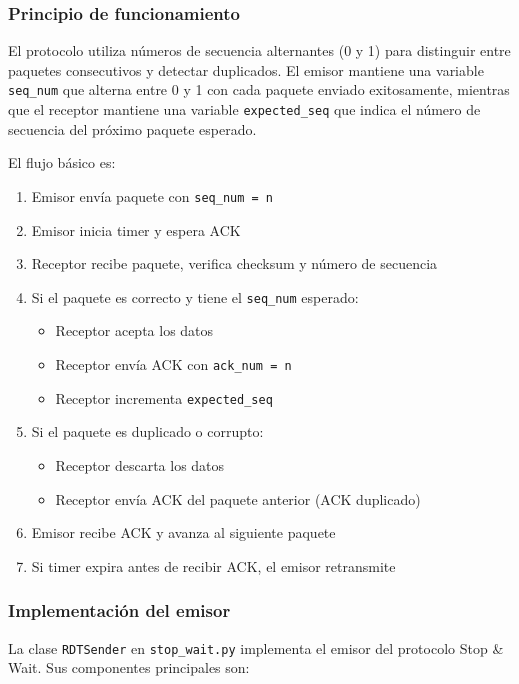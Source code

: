 \subsubsection{Principio de funcionamiento}

El protocolo utiliza números de secuencia alternantes (0 y 1) para distinguir entre paquetes consecutivos y detectar duplicados. El emisor mantiene una variable \texttt{seq\_num} que alterna entre 0 y 1 con cada paquete enviado exitosamente, mientras que el receptor mantiene una variable \texttt{expected\_seq} que indica el número de secuencia del próximo paquete esperado.

El flujo básico es:
\begin{enumerate}
    \item Emisor envía paquete con \texttt{seq\_num = n}
    \item Emisor inicia timer y espera ACK
    \item Receptor recibe paquete, verifica checksum y número de secuencia
    \item Si el paquete es correcto y tiene el \texttt{seq\_num} esperado:
    \begin{itemize}
        \item Receptor acepta los datos
        \item Receptor envía ACK con \texttt{ack\_num = n}
        \item Receptor incrementa \texttt{expected\_seq}
    \end{itemize}
    \item Si el paquete es duplicado o corrupto:
    \begin{itemize}
        \item Receptor descarta los datos
        \item Receptor envía ACK del paquete anterior (ACK duplicado)
    \end{itemize}
    \item Emisor recibe ACK y avanza al siguiente paquete
    \item Si timer expira antes de recibir ACK, el emisor retransmite
\end{enumerate}

\subsubsection{Implementación del emisor}

La clase \texttt{RDTSender} en \texttt{stop\_wait.py} implementa el emisor del protocolo Stop \& Wait. Sus componentes principales son:
\\

